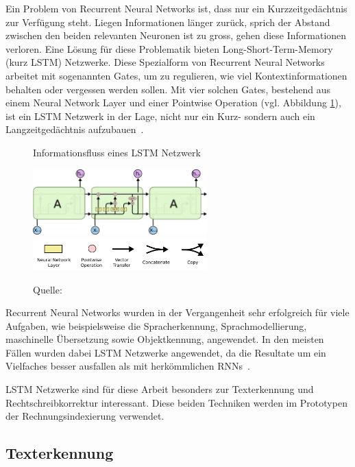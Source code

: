 Ein Problem von Recurrent Neural Networks ist, dass nur ein Kurzzeitgedächtnis zur Verfügung steht. Liegen Informationen länger zurück, sprich der Abstand zwischen den beiden relevanten Neuronen ist zu gross, gehen diese Informationen verloren. Eine Lösung für diese Problematik bieten Long-Short-Term-Memory (kurz LSTM) Netzwerke. Diese Spezialform von Recurrent Neural Networks arbeitet mit sogenannten Gates, um zu regulieren, wie viel Kontextinformationen behalten oder vergessen werden sollen. Mit vier solchen Gates, bestehend aus einem Neural Network Layer und einer Pointwise Operation (vgl. Abbildung \ref{lstm1}), ist ein LSTM Netzwerk in der Lage, nicht nur ein Kurz- sondern auch ein Langzeitgedächtnis aufzubauen~\autocite{Olah2015}.
\begin{figure}[h!]
    \captionsetup{width=.9\linewidth}
    \caption{Informationsfluss eines LSTM Netzwerk}
    \label{lstm1}
    \centering
    \includegraphics[width=0.6\textwidth]{graphics/lstm.png}\\
    \vspace{0.5cm}
    \includegraphics[width=0.6\textwidth]{graphics/lstm-notation.png}\\
    \vspace{0.2cm}
    \caption*{Quelle: \textcite{Olah2015}}
\end{figure}

Recurrent Neural Networks wurden in der Vergangenheit sehr erfolgreich für viele Aufgaben, wie beispielsweise die Spracherkennung, Sprachmodellierung, maschinelle Übersetzung sowie Objektkennung, angewendet. In den meisten Fällen wurden dabei LSTM Netzwerke angewendet, da die Resultate um ein Vielfaches besser ausfallen als mit herkömmlichen RNNs~\autocite{Olah2015}.

LSTM Netzwerke sind für diese Arbeit besonders zur Texterkennung und Rechtschreibkorrektur interessant. Diese beiden Techniken werden im Prototypen der Rechnungsindexierung verwendet.

\subsection{Texterkennung}

